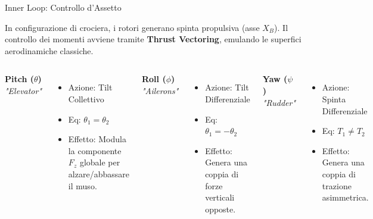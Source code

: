 \documentclass[aspectratio=169]{beamer} %
\begin{document}
\begin{frame}{Inner Loop: Controllo d'Assetto}
    
    In configurazione di crociera, i rotori generano spinta propulsiva (asse $X_B$). Il controllo dei momenti avviene tramite \textbf{Thrust Vectoring}, emulando le superfici aerodinamiche classiche.

    \begin{columns}[T]
        \centering
        \textbf{Pitch ($\theta$)} \\
        \textit{"Elevator"}
        \begin{itemize}
            \item \small{Azione: Tilt Collettivo}
            \item \small{Eq: $\theta_1 = \theta_2$}
            \item \small{Effetto: Modula la componente $F_z$ globale per alzare/abbassare il muso.}
        \end{itemize}

        \centering
        \textbf{Roll ($\phi$)} \\
        \textit{"Ailerons"}
        \begin{itemize}
            \item \small{Azione: Tilt Differenziale}
            \item \small{Eq: $\theta_1 = -\theta_2$}
            \item \small{Effetto: Genera una coppia di forze verticali opposte.}
        \end{itemize}

        \centering
        \textbf{Yaw ($\psi$)} \\
        \textit{"Rudder"}
        \begin{itemize}
            \item \small{Azione: Spinta Differenziale}
            \item \small{Eq: $T_1 \neq T_2$}
            \item \small{Effetto: Genera una coppia di trazione asimmetrica.}
        \end{itemize}
    \end{columns}
\end{frame}
\end{document}
